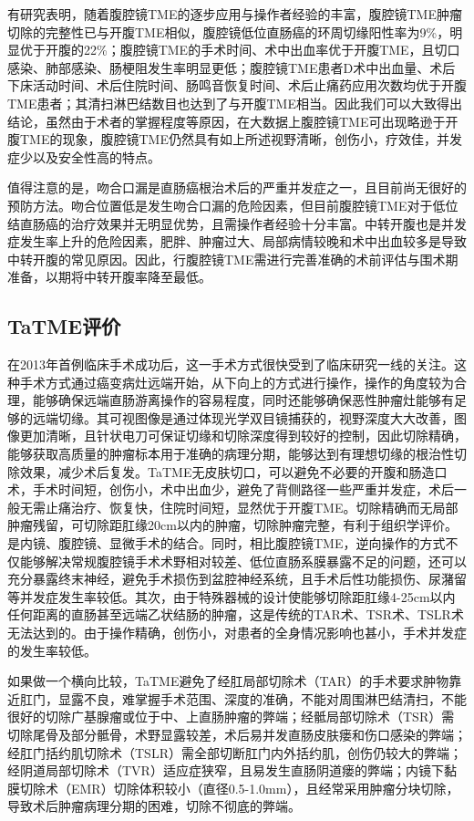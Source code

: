 \documentclass[a4paper,11pt,onecolumn,twoside]{article}
\begin{document}
\begin{multicols}{2}
    有研究表明，随着腹腔镜TME的逐步应用与操作者经验的丰富，腹腔镜TME肿瘤切除的完整性已与开腹TME相似，腹腔镜低位直肠癌的环周切缘阳性率为9\%，明显优于开腹的22\%；腹腔镜TME的手术时间、术中出血率优于开腹TME，且切口感染、肺部感染、肠梗阻发生率明显更低\supercite{2,18}；腹腔镜TME患者D术中出血量、术后下床活动时间、术后住院时间、肠鸣音恢复时间、术后止痛药应用次数均优于开腹TME患者\supercite{19,20}；其清扫淋巴结数目也达到了与开腹TME相当。因此我们可以大致得出结论，虽然由于术者的掌握程度等原因，在大数据上腹腔镜TME可出现略逊于开腹TME的现象，腹腔镜TME仍然具有如上所述视野清晰，创伤小，疗效佳，并发症少以及安全性高的特点。

    值得注意的是，吻合口漏是直肠癌根治术后的严重并发症之一，且目前尚无很好的预防方法。吻合位置低是发生吻合口漏的危险因素，但目前腹腔镜TME对于低位结直肠癌的治疗效果并无明显优势，且需操作者经验十分丰富。中转开腹也是并发症发生率上升的危险因素，肥胖、肿瘤过大、局部病情较晚和术中出血较多是导致中转开腹的常见原因。因此，行腹腔镜TME需进行完善准确的术前评估与围术期准备，以期将中转开腹率降至最低。
    \subsection{TaTME评价}
    在2013年首例临床手术成功后，这一手术方式很快受到了临床研究一线的关注。这种手术方式通过癌变病灶远端开始，从下向上的方式进行操作，操作的角度较为合理，能够确保远端直肠游离操作的容易程度，同时还能够确保恶性肿瘤灶能够有足够的远端切缘。其可视图像是通过体现光学双目镜捕获的，视野深度大大改善，图像更加清晰，且针状电刀可保证切缘和切除深度得到较好的控制，因此切除精确，能够获取高质量的肿瘤标本用于准确的病理分期，能够达到有理想切缘的根治性切除效果，减少术后复发。TaTME无皮肤切口，可以避免不必要的开腹和肠造口术，手术时间短，创伤小，术中出血少，避免了背侧路径一些严重并发症，术后一般无需止痛治疗、恢复快，住院时间短，显然优于开腹TME。切除精确而无局部肿瘤残留，可切除距肛缘20cm以内的肿瘤，切除肿瘤完整，有利于组织学评价。是内镜、腹腔镜、显微手术的结合。同时，相比腹腔镜TME，逆向操作的方式不仅能够解决常规腹腔镜手术术野相对较差、低位直肠系膜暴露不足的问题，还可以充分暴露终末神经，避免手术损伤到盆腔神经系统，且手术后性功能损伤、尿潴留等并发症发生率较低。其次，由于特殊器械的设计使能够切除距肛缘4-25cm以内任何距离的直肠甚至远端乙状结肠的肿瘤，这是传统的TAR术、TSR术、TSLR术无法达到的。由于操作精确，创伤小，对患者的全身情况影响也甚小，手术并发症的发生率较低。

    如果做一个横向比较，TaTME避免了经肛局部切除术（TAR）的手术要求肿物靠近肛门，显露不良，难掌握手术范围、深度的准确，不能对周围淋巴结清扫，不能很好的切除广基腺瘤或位于中、上直肠肿瘤的弊端；经骶局部切除术（TSR）需切除尾骨及部分骶骨，术野显露较差，术后易并发直肠皮肤瘘和伤口感染的弊端；经肛门括约肌切除术（TSLR）需全部切断肛门内外括约肌，创伤仍较大的弊端；经阴道局部切除术（TVR）适应症狭窄，且易发生直肠阴道瘘的弊端；内镜下黏膜切除术（EMR）切除体积较小（直径0.5-1.0mm），且经常采用肿瘤分块切除，导致术后肿瘤病理分期的困难，切除不彻底的弊端。


\end{multicols}
\end{document}
